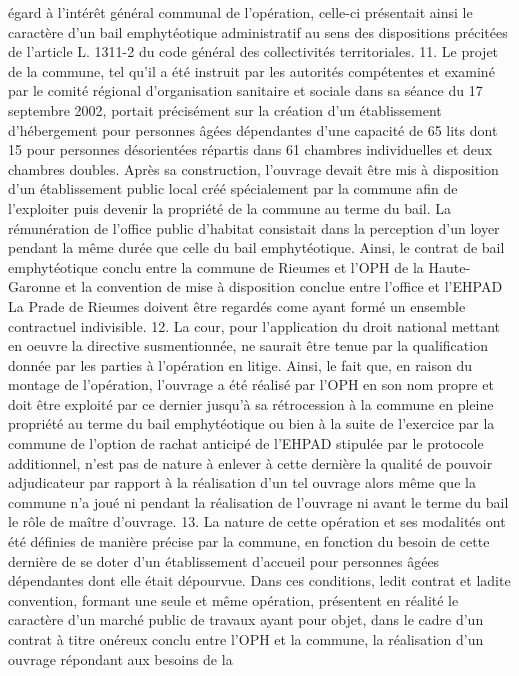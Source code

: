 \documentclass[11pt,a4paper]{report}
\begin{document}
égard à l'intérêt général communal de l'opération, celle-ci présentait ainsi le caractère d'un bail emphytéotique
administratif au sens des dispositions précitées de l'article L. 1311-2 du code général des collectivités
territoriales.
11. Le projet de la commune, tel qu'il a été instruit par les autorités compétentes et examiné par le comité
régional d'organisation sanitaire et sociale dans sa séance du 17 septembre 2002, portait précisément sur la
création d'un établissement d'hébergement pour personnes âgées dépendantes d'une capacité de 65 lits dont 15
pour personnes désorientées répartis dans 61 chambres individuelles et deux chambres doubles. Après sa
construction, l'ouvrage devait être mis à disposition d'un établissement public local créé spécialement par la
commune afin de l'exploiter puis devenir la propriété de la commune au terme du bail. La rémunération de
l'office public d'habitat consistait dans la perception d'un loyer pendant la même durée que celle du bail
emphytéotique. Ainsi, le contrat de bail emphytéotique conclu entre la commune de Rieumes et l'OPH de la
Haute-Garonne et la convention de mise à disposition conclue entre l'office et l'EHPAD La Prade de Rieumes
doivent être regardés come ayant formé un ensemble contractuel indivisible.
12. La cour, pour l'application du droit national mettant en oeuvre la directive susmentionnée, ne saurait être
tenue par la qualification donnée par les parties à l'opération en litige. Ainsi, le fait que, en raison du montage
de l'opération, l'ouvrage a été réalisé par l'OPH en son nom propre et doit être exploité par ce dernier jusqu'à
sa rétrocession à la commune en pleine propriété au terme du bail emphytéotique ou bien à la suite de l'exercice
par la commune de l'option de rachat anticipé de l'EHPAD stipulée par le protocole additionnel, n'est pas de
nature à enlever à cette dernière la qualité de pouvoir adjudicateur par rapport à la réalisation d'un tel ouvrage
alors même que la commune n'a joué ni pendant la réalisation de l'ouvrage ni avant le terme du bail le rôle de
maître d'ouvrage.
13. La nature de cette opération et ses modalités ont été définies de manière précise par la commune, en fonction
du besoin de cette dernière de se doter d'un établissement d'accueil pour personnes âgées dépendantes dont elle
était dépourvue. Dans ces conditions, ledit contrat et ladite convention, formant une seule et même opération,
présentent en réalité le caractère d'un marché public de travaux ayant pour objet, dans le cadre d'un contrat à
titre onéreux conclu entre l'OPH et la commune, la réalisation d'un ouvrage répondant aux besoins de la
\end{document}
